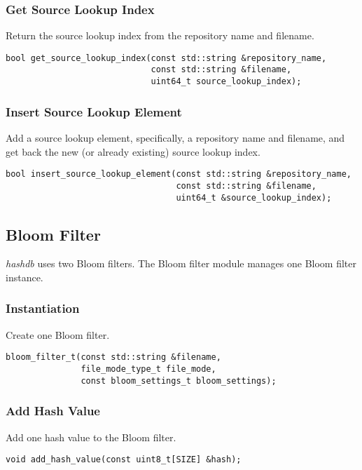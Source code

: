\documentclass[12pt,twoside]{article}
\newcommand{\hdb}{\emph{hashdb}\xspace}
\begin{document}
\subsubsection{Get Source Lookup Index}
Return the source lookup index from the repository name and filename.
\begin{small}
\begin{verbatim}
bool get_source_lookup_index(const std::string &repository_name,
                             const std::string &filename,
                             uint64_t source_lookup_index);
\end{verbatim}
\end{small}

\subsubsection{Insert Source Lookup Element}
Add a source lookup element, specifically, a repository name and filename,
and get back the new (or already existing) source lookup index.
\begin{small}
\begin{verbatim}
bool insert_source_lookup_element(const std::string &repository_name,
                                  const std::string &filename,
                                  uint64_t &source_lookup_index);
\end{verbatim}
\end{small}

\subsection{Bloom Filter}
\hdb uses two Bloom filters.
The Bloom filter module manages one Bloom filter instance.

\subsubsection{Instantiation}
Create one Bloom filter.
\begin{small}
\begin{verbatim}
bloom_filter_t(const std::string &filename,
               file_mode_type_t file_mode,
               const bloom_settings_t bloom_settings);
\end{verbatim}
\end{small}

\subsubsection{Add Hash Value}
Add one hash value to the Bloom filter.
\begin{small}
\begin{verbatim}
void add_hash_value(const uint8_t[SIZE] &hash);
\end{verbatim}
\end{small}
\end{document}
